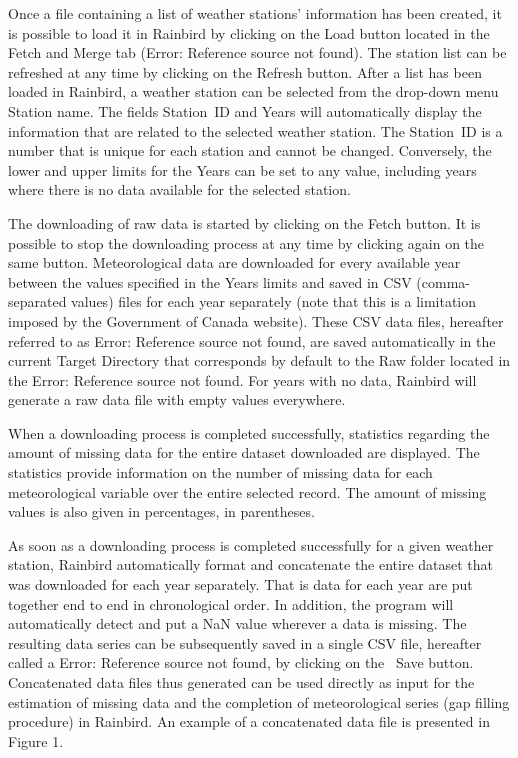 \documentclass[12pt, letterpaper, fleqn]{report}
\begin{document}
Once a file containing a list of weather stations' information has been created, it is possible to load it in Rainbird by clicking on the  Load button located in the Fetch and Merge tab (Error: Reference source not found). The station list can be refreshed at any time by clicking on the  Refresh button. 
After a list has been loaded in Rainbird, a weather station can be selected from the drop-down menu Station name. The fields Station ID and Years will automatically display the information that are related to the selected weather station. The Station ID is a number that is unique for each station and cannot be changed. Conversely, the lower and upper limits for the Years can be set to any value, including years where there is no data available for the selected station. 

The downloading of raw data is started by clicking on the  Fetch button. It is possible to stop the downloading process at any time by clicking again on the same button. Meteorological data are downloaded for every available year between the values specified in the Years limits and saved in CSV (comma-separated values) files for each year separately (note that this is a limitation imposed by the Government of Canada website). These CSV data files, hereafter referred to as Error: Reference source not found, are saved automatically in the current Target Directory that corresponds by default to the Raw folder located in the Error: Reference source not found. For years with no data, Rainbird will generate a raw data file with empty values everywhere.

When a downloading process is completed successfully, statistics regarding the amount of missing data for the entire dataset downloaded are displayed. The statistics provide information on the number of missing data for each meteorological variable over the entire selected record. The amount of missing values is also given in percentages, in parentheses.

As soon as a downloading process is completed successfully for a given weather station, Rainbird automatically format and concatenate the entire dataset that was downloaded for each year separately. That is data for each year are put together end to end in chronological order. In addition, the program will automatically detect and put a NaN value wherever a data is missing. The resulting data series can be subsequently saved in a single CSV file, hereafter called a Error: Reference source not found, by clicking on the   Save button. Concatenated data files thus generated can be used directly as input for the estimation of missing data and the completion of meteorological series (gap filling procedure) in Rainbird. An example of a concatenated data file is presented in Figure 1.
\end{document}
